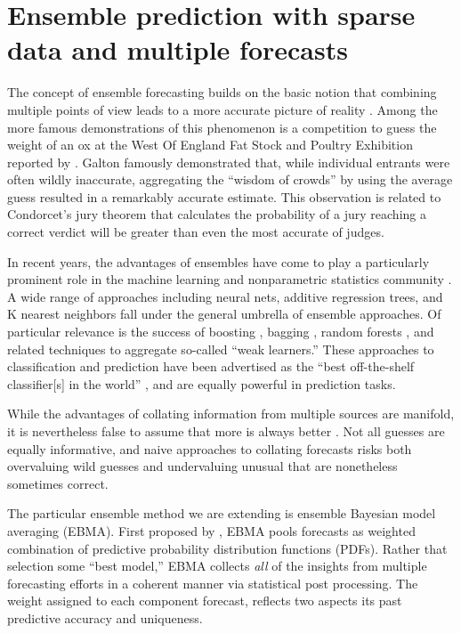 \documentclass[12pt,fullpage,endnotes]{article}
\begin{document}
\section{Ensemble prediction with sparse data and multiple forecasts }
\label{theproblem}

The concept of ensemble forecasting builds on the basic notion that
combining multiple points of view leads to a more accurate picture of
reality \citep[c.f.,][]{Surowiecki:2004}.  Among the more famous
demonstrations of this phenomenon is a competition to guess the weight
of an ox at the West Of England Fat Stock and Poultry Exhibition
reported by \citet{Galton:1907}.  Galton famously demonstrated that,
while individual entrants were often wildly inaccurate, aggregating
the ``wisdom of crowds'' by using the average guess resulted in a
remarkably accurate estimate.  This observation is related to
Condorcet's jury theorem that calculates the probability of a jury
reaching a correct verdict will be greater than even the most accurate
of judges.

In recent years, the advantages of ensembles have come to play a
particularly prominent role in the machine learning and nonparametric
statistics community \citep{Hastie:2009}. A wide range of approaches
including neural nets, additive regression trees, and K nearest
neighbors fall under the general umbrella of ensemble approaches.  Of
particular relevance is the success of boosting \citep{Freund:1997,
  Friedman:2001}, bagging \citep{Breiman:1996}, random forests
\citep{Breiman:2001}, and related techniques
\citep[e.g.,][]{Chipman:2010} to aggregate so-called ``weak
learners.''  These approaches to classification and prediction have
been advertised as the ``best off-the-shelf classifier[s] in the
world'' \citep{Breiman:1996}, and are equally powerful in prediction
tasks.

While the advantages of collating information from multiple sources
are manifold, it is nevertheless false to assume that more is always
better \citep[c.f.,][]{Page:2011}.  Not all guesses are equally
informative, and naive approaches to collating forecasts risks both
overvaluing wild guesses and undervaluing unusual that are nonetheless
sometimes correct.  

The particular ensemble method we are extending is ensemble Bayesian
model averaging (EBMA). First proposed by \citet{Raftery:2005}, EBMA
pools forecasts as weighted combination of predictive probability
distribution functions (PDFs).  Rather that selection some ``best
model,'' EBMA collects \textit{all} of the insights from multiple
forecasting efforts in a coherent manner via statistical post
processing.  The weight assigned to each component forecast, reflects
two aspects its past predictive accuracy and uniqueness.   
\end{document}
